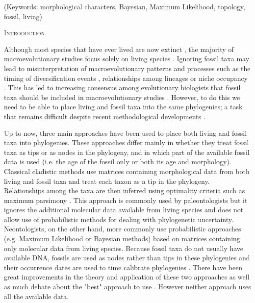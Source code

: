 \documentclass[12pt,letterpaper]{article}
\renewcommand{\section}[1]{%
\bigskip
\begin{center}
\begin{Large}
\normalfont\scshape #1
\medskip
\end{Large}
\end{center}}
\begin{document}
\noindent (Keywords: morphological characters, Bayesian, Maximum Likelihood, topology, fossil, living)\\

\vspace{1.5in}

\newpage 

%
%

\section{Introduction}

Although most species that have ever lived are now extinct \citep{novacek1992ext,raup1993extinction}, the majority of macroevolutionary studies focus solely on living species \citep[e.g.][]{meredithimpacts2011,jetzthe2012}. Ignoring fossil taxa may lead to misinterpretation of macroevolutionary patterns and processes such as the timing of diversification events \citep[e.g.][]{pyrondivergence2011}, relationships among lineages \citep[e.g.][]{manosphylogeny2007} or niche occupancy \citep[e.g.][]{pearmanniche2008}. This has led to increasing consensus among evolutionary biologists that fossil taxa should be included in macroevolutionary studies \citep{jacksonwhat2006,quentaldiversity2010,dietlconservation2011,slaterunifying2013,fritzdiversity2013}. However, to do this we need to be able to place living and fossil taxa into the same phylogenies; a task that remains difficult despite recent methodological developments \citep[e.g.][]{pyrondivergence2011,ronquista2012,BEASTmaster}.

Up to now, three main approaches have been used to place both living and fossil taxa into phylogenies. These approaches differ mainly in whether they treat fossil taxa as tips or as nodes in the phylogeny, and in which part of the available fossil data is used (i.e. the age of the fossil only or both its age and morphology). Classical cladistic methods use matrices containing morphological data from both living and fossil taxa and treat each taxon as a tip in the phylogeny. Relationships among the taxa are then inferred using optimality criteria such as maximum parsimony \citep{simpson1945}. This approach is commonly used by paleontologists but it ignores the additional molecular data available from living species and does not allow use of probabilistic methods for dealing with phylogenetic uncertainty. Neontologists, on the other hand, more commonly use probabilistic approaches (e.g. Maximum Likelihood or Bayesian methods) based on matrices containing only molecular data from living species. Because fossil taxa do not usually have available DNA, fossils are used as nodes rather than tips in these phylogenies and their occurrence dates are used to time calibrate phylogenies \citep{zuckerkandl1965}. There have been great improvements in the theory and application of these two approaches \citep[e.g.][]{bapsta2013,stadlerdating2013,heaththe2013} as well as much debate about the "best" approach to use \citep[e.g.][]{spencerefficacy2013,wrightbayesian2014}. However neither approach uses all the available data.
\end{document}

